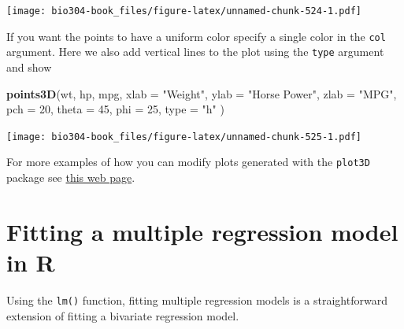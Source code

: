 \documentclass[]{book}
\newenvironment{Shaded}{\begin{snugshade}}{\end{snugshade}}
\newcommand{\DataTypeTok}[1]{\textcolor[rgb]{0.13,0.29,0.53}{#1}}
\newcommand{\DecValTok}[1]{\textcolor[rgb]{0.00,0.00,0.81}{#1}}
\newcommand{\KeywordTok}[1]{\textcolor[rgb]{0.13,0.29,0.53}{\textbf{#1}}}
\newcommand{\NormalTok}[1]{#1}
\newcommand{\StringTok}[1]{\textcolor[rgb]{0.31,0.60,0.02}{#1}}
\theoremstyle{definition}
\theoremstyle{definition}
\theoremstyle{definition}
\theoremstyle{remark}
\begin{document}
\texttt{[image: bio304-book\_files/figure-latex/unnamed-chunk-524-1.pdf]}

If you want the points to have a uniform color specify a single color in
the \texttt{col} argument. Here we also add vertical lines to the plot
using the \texttt{type} argument and show

\begin{Shaded}
\begin{Highlighting}[]
\KeywordTok{points3D}\NormalTok{(wt, hp, mpg,}
         \DataTypeTok{xlab =} \StringTok{"Weight"}\NormalTok{, }\DataTypeTok{ylab =} \StringTok{"Horse Power"}\NormalTok{, }\DataTypeTok{zlab =} \StringTok{"MPG"}\NormalTok{,}
         \DataTypeTok{pch =} \DecValTok{20}\NormalTok{,}
         \DataTypeTok{theta =} \DecValTok{45}\NormalTok{, }\DataTypeTok{phi =} \DecValTok{25}\NormalTok{,}
         \DataTypeTok{type =} \StringTok{"h"}
\NormalTok{)}
\end{Highlighting}
\end{Shaded}

\texttt{[image: bio304-book\_files/figure-latex/unnamed-chunk-525-1.pdf]}

For more examples of how you can modify plots generated with the
\texttt{plot3D} package see
\href{http://www.sthda.com/english/wiki/impressive-package-for-3d-and-4d-graph-r-software-and-data-visualization}{this
web page}.

\hypertarget{fitting-a-multiple-regression-model-in-r}{%
\section{Fitting a multiple regression model in
R}\label{fitting-a-multiple-regression-model-in-r}}

Using the \texttt{lm()} function, fitting multiple regression models is
a straightforward extension of fitting a bivariate regression model.
\end{document}
